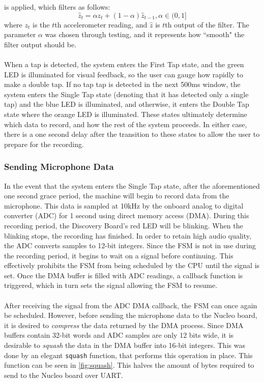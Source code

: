 is applied, which filters as follows:
\begin{equation}
	\hat{z}_{t} = \alpha z_{t} + (1-\alpha)\hat{z}_{t-1}, \alpha\in(0,1]
\end{equation}
where $z_t$ is the $t$th accelerometer reading, and $\hat{z}$ is $t$th output of the filter. The
parameter $\alpha$ was chosen through testing, and it represents how ``smooth" the filter output
should be.\\\\
When a tap is detected, the system enters the First Tap state, and the green LED is illuminated for
visual feedback, so the user can gauge how rapidly to make a double tap. If no tap tap is detected
in the next 500ms window, the system enters the Single Tap state (denoting that it has detected only
a single tap) and the blue LED is illuminated, and otherwise, it enters the Double Tap state where
the orange LED is illuminated. These states ultimately determine
which data to record, and how the rest of the system proceeds. In either case, there is a one second
delay after the transition to these states to allow the user to prepare for the recording.
\subsubsection{Sending Microphone Data}
In the event that the system enters the Single Tap state, after the aforementioned one second grace
period, the machine will begin to record data from the microphone. This data is sampled at 10kHz by
the onboard analog to digital converter (ADC) for 1 second using direct memory access (DMA). During
this recording period, the Discovery Board's red LED will be blinking. When the blinking stops, the
recording has finished. In
order to retain high audio quality, the ADC converts samples to 12-bit integers. Since
the FSM is not in use during the recording period, it begins to wait on a signal before continuing.
This effectively prohibits the FSM from being scheduled by the CPU until the signal is set. Once
the DMA buffer is filled with ADC readings, a callback function is triggered, which in turn sets the
signal allowing the FSM to resume.\\\\
After receiving the signal from the ADC DMA callback, the FSM can once again be scheduled. However,
before sending the microphone data to the Nucleo board, it is desired to \textit{compress} the data
returned by the DMA process. Since DMA buffers contain 32-bit words and ADC samples are only 12 bits
wide, it is desirable to \textit{squash} the data in the DMA buffer into 16-bit integers. This was
done by an elegant \texttt{squash} function, that performs this operation in place. This function can be seen in \autoref{fig:squash}. This halves the
amount of bytes required to send to the Nucleo board over UART.\\\\

